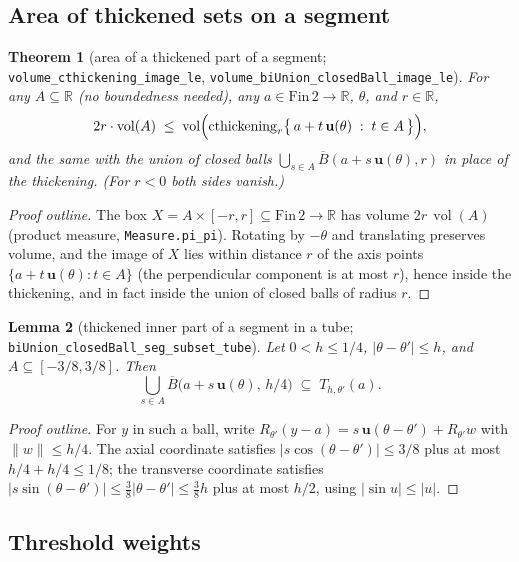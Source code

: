 \documentclass[11pt,a4paper]{article}
\newcommand{\R}{\mathbb{R}}
\newcommand{\vol}{\operatorname{vol}}                %
\newcommand{\FinTwo}{\ensuremath{\mathrm{Fin}\,2 \to \R}}
\newcommand{\dir}{\mathbf{u}}                        %
\newcommand{\tube}{T}                                %
\newcommand{\lname}[1]{\texttt{#1}}                  %
\newcommand{\lb}{\_\allowbreak}                      %
\newtheorem{theorem}{Theorem}[section]
\newtheorem{lemma}[theorem]{Lemma}
\theoremstyle{definition}
\theoremstyle{remark}
\begin{document}
\subsection{Area of thickened sets on a segment}

\begin{theorem}[{area of a thickened part of a segment;
\lname{volume\lb cthickening\lb image\lb le},
\lname{volume\lb biUnion\lb closedBall\lb image\lb le}}]
\label{thm:thickening}
For any $A\subseteq\R$ (no boundedness needed), any $a\in\FinTwo$, $\theta$, and $r\in\R$,
\[
  2r\cdot\vol(A)\;\le\;
  \vol\Bigl(\operatorname{cthickening}_r
   \bigl\{\,a+t\,\dir(\theta)\;:\;t\in A\,\bigr\}\Bigr),
\]
and the same with the union of closed balls
$\bigcup_{s\in A}\overline{B}(a+s\,\dir(\theta),r)$ in place of the thickening.  (For
$r<0$ both sides vanish.)
\end{theorem}

\begin{proof}[Proof outline]
The box $X = A\times[-r,r]\subseteq\FinTwo$ has volume $2r\,\vol(A)$
(product measure, \lname{Measure.pi\_pi}).  Rotating by $-\theta$ and translating
preserves volume, and the image of $X$ lies within distance $r$ of the axis points
$\{a+t\,\dir(\theta):t\in A\}$ (the perpendicular component is at most $r$), hence inside
the thickening, and in fact inside the union of closed balls of radius $r$.
\end{proof}

\begin{lemma}[{thickened inner part of a segment in a tube;
\lname{biUnion\lb closedBall\lb seg\lb subset\lb tube}}]
\label{lem:seg-in-tube}
Let $0<h\le 1/4$, $|\theta-\theta'|\le h$, and $A\subseteq[-3/8,3/8]$.  Then
\[
  \bigcup_{s\in A} \overline{B}\bigl(a+s\,\dir(\theta),\,h/4\bigr)
  \;\subseteq\; \tube_{h,\theta'}(a).
\]
\end{lemma}

\begin{proof}[Proof outline]
For $y$ in such a ball, write $R_{\theta'}(y-a)=s\,\dir(\theta-\theta')+R_{\theta'}w$
with $\|w\|\le h/4$.  The axial coordinate satisfies
$|s\cos(\theta-\theta')|\le 3/8$ plus at most $h/4+h/4\le 1/8$; the transverse coordinate
satisfies $|s\sin(\theta-\theta')|\le \tfrac38|\theta-\theta'|\le \tfrac38 h$ plus at
most $h/2$, using $|\sin u|\le|u|$.
\end{proof}

\subsection{Threshold weights}
\end{document}
